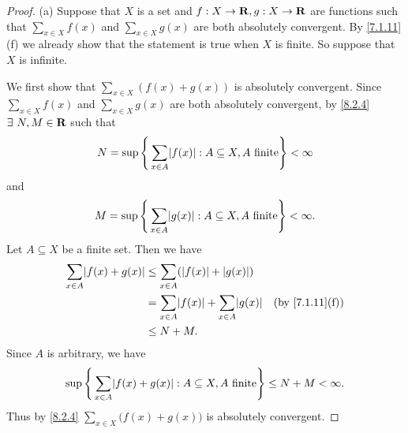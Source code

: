 \begin{proof}{(a)}
  Suppose that \(X\) is a set and \(f : X \to \mathbf{R}, g : X \to \mathbf{R}\) are functions such that \(\sum_{x \in X} f(x)\) and \(\sum_{x \in X} g(x)\) are both absolutely convergent.
  By \cref{7.1.11}(f) we already show that the statement is true when \(X\) is finite.
  So suppose that \(X\) is infinite.

  We first show that \(\sum_{x \in X} (f(x) + g(x))\) is absolutely convergent.
  Since \(\sum_{x \in X} f(x)\) and \(\sum_{x \in X} g(x)\) are both absolutely convergent, by \cref{8.2.4} \(\exists\ N, M \in \mathbf{R}\) such that
  \[
    N = \sup\Bigg\{\sum_{x \in A} \abs{f(x)} : A \subseteq X, A \text{ finite}\Bigg\} < \infty
  \]
  and
  \[
    M = \sup\Bigg\{\sum_{x \in A} \abs{g(x)} : A \subseteq X, A \text{ finite}\Bigg\} < \infty.
  \]
  Let \(A \subseteq X\) be a finite set.
  Then we have
  \begin{align*}
    \sum_{x \in A} \abs{f(x) + g(x)} & \leq \sum_{x \in A} (\abs{f(x)} + \abs{g(x)})                                          \\
                                     & = \sum_{x \in A} \abs{f(x)} + \sum_{x \in A} \abs{g(x)} & \text{(by \cref{7.1.11}(f))} \\
                                     & \leq N + M.
  \end{align*}
  Since \(A\) is arbitrary, we have
  \[
    \sup\Bigg\{\sum_{x \in A} \abs{f(x) + g(x)} : A \subseteq X, A \text{ finite}\Bigg\} \leq N + M < \infty.
  \]
  Thus by \cref{8.2.4} \(\sum_{x \in X} \big(f(x) + g(x)\big)\) is absolutely convergent.


\end{proof}
